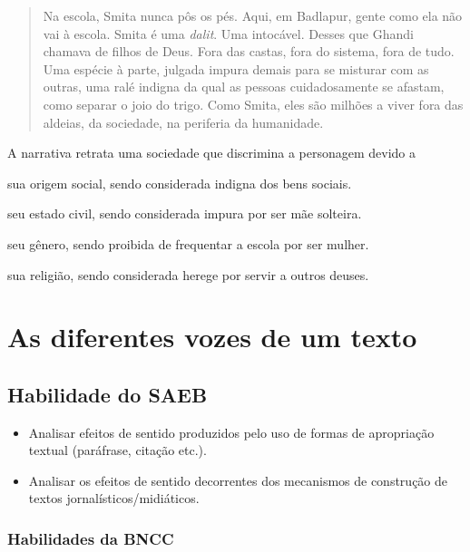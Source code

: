 \begin{quote}
Na escola, Smita nunca pôs os pés. Aqui, em Badlapur, gente como ela não
vai à escola. Smita é uma \emph{dalit}. Uma intocável. Desses que Ghandi
chamava de filhos de Deus. Fora das castas, fora do sistema, fora de
tudo. Uma espécie à parte, julgada impura demais para se misturar com as
outras, uma ralé indigna da qual as pessoas cuidadosamente se afastam,
como separar o joio do trigo. Como Smita, eles são milhões a viver fora
das aldeias, da sociedade, na periferia da humanidade.
\end{quote}


A narrativa retrata uma sociedade que discrimina a personagem devido a

\begin{escolha}
\item sua origem social, sendo considerada indigna dos bens sociais.

\item seu estado civil, sendo considerada impura por ser mãe solteira.

\item seu gênero, sendo proibida de frequentar a escola por ser mulher.

\item sua religião, sendo considerada herege por servir a outros deuses.
\end{escolha}

\chapter{As diferentes vozes de um texto}

\section{Habilidade do SAEB}

\begin{itemize}
\item Analisar efeitos de sentido produzidos
pelo uso de formas de apropriação textual (paráfrase, citação etc.).
\item Analisar os efeitos de sentido decorrentes dos mecanismos de construção
de textos jornalísticos/midiáticos.
\end{itemize}

\subsection{Habilidades da BNCC}

